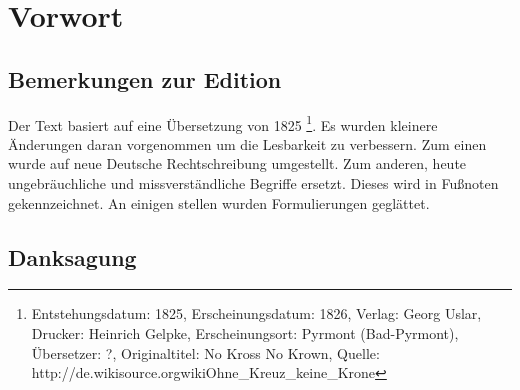 \part{Vorwort}


\chapter{Bemerkungen zur Edition}
Der Text basiert auf eine Übersetzung von 1825 \footnote{Entstehungsdatum: 1825, Erscheinungsdatum: 1826, Verlag: Georg Uslar, Drucker: Heinrich Gelpke, Erscheinungsort: Pyrmont (Bad-Pyrmont), Übersetzer: ?, Originaltitel: No Kross No Krown, Quelle: http://de.wikisource.org\/wiki\/Ohne\_Kreuz\_keine\_Krone}. Es wurden kleinere Änderungen daran vorgenommen um die Lesbarkeit zu verbessern. Zum einen wurde auf neue Deutsche Rechtschreibung umgestellt. Zum anderen, heute ungebräuchliche und missverständliche Begriffe ersetzt. Dieses wird in Fußnoten gekennzeichnet. An einigen stellen wurden Formulierungen geglättet.

\chapter{Danksagung}
